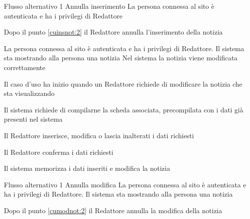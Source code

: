 %
{Flusso alternativo 1}%
{Annulla inserimento}%
{La persona connessa al sito è autenticata e ha i privilegi di Redattore}%
{\postNulle}%
{\begin{enumCU}
		\item Dopo il punto \ref{cuinsnot:2} il Redattore annulla l'inserimento della notizia
	\end{enumCU}}%


{}
{La persona connessa al sito è autenticata e ha i privilegi di Redattore. Il sistema sta mostrando alla persona una notizia}
{Nel sistema la notizia viene modificata correttamente}
{\begin{enumCU}
	\item Il caso d'uso ha inizio quando un Redattore richiede di modificare la notizia che sta visualizzando
	\item Il sistema richiede di compilarne la scheda associata, precompilata con i dati già presenti nel sistema 
	\item Il Redattore inserisce, modifica o lascia inalterati i dati richiesti\label{cumodnot:2}
	\item Il Redattore conferma i dati richiesti
	\item Il sistema memorizza i dati inseriti e modifica la notizia
\end{enumCU}}
%
{Flusso alternativo 1}%
{Annulla modifica}%
{La persona connessa al sito è autenticata e ha i privilegi di Redattore. Il sistema sta mostrando alla persona una notizia}%
{\postNulle}%
{\begin{enumCU}
		\item Dopo il punto \ref{cumodnot:2} il Redattore annulla la modifica della notizia
\end{enumCU}}%


